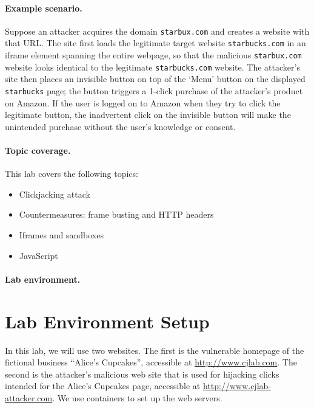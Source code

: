 \paragraph{Example scenario.} Suppose an attacker acquires the domain
\texttt{starbux.com} and creates a website with that URL. The site first
loads the legitimate target website \texttt{starbucks.com} in an iframe
element spanning the entire webpage, so that the
malicious \texttt{starbux.com} website looks identical to the legitimate
\texttt{starbucks.com} website.  The attacker's site then places an invisible
button on top of the `Menu' button on the displayed \texttt{starbucks} page;
the button triggers a 1-click purchase of the attacker's product on
Amazon.  If the user is logged on to Amazon when they try to click the
legitimate button, the inadvertent click on the invisible button will
make the unintended purchase without the user's knowledge or consent.

\paragraph{Topic coverage.} This lab covers the following topics:
\begin{itemize}[noitemsep]
 \item Clickjacking attack
 \item Countermeasures: frame busting and HTTP headers
 \item Iframes and sandboxes
 \item JavaScript
\end{itemize}

\paragraph{Lab environment.}
\seedenvironmentB
\nodependency



\section{Lab Environment Setup}

In this lab, we will use two websites.  The first is the vulnerable
homepage of the fictional business ``Alice's Cupcakes'', accessible at
\url{http://www.cjlab.com}.  The second is the attacker's malicious web site
that is used for hijacking clicks intended for the Alice's Cupcakes
page, accessible at \url{http://www.cjlab-attacker.com}. We
use containers to set up the web servers.
 
